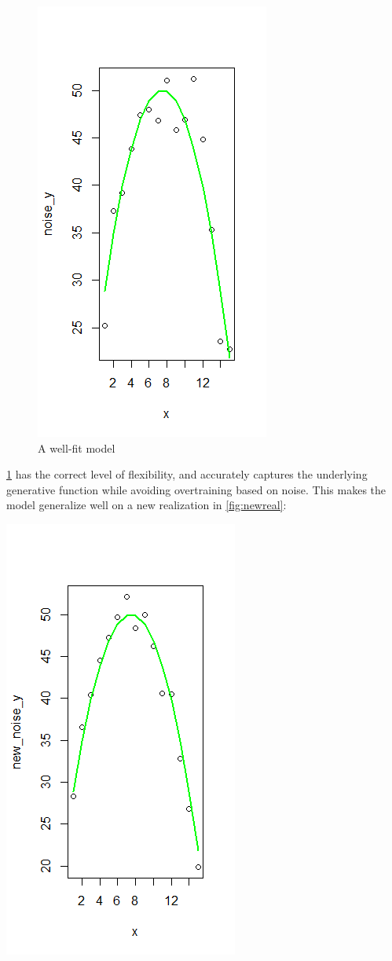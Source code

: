\documentclass[12pt,twoside]{reedthesis}
\begin{document}
\begin{figure}
\centering
\includegraphics{figure/true.png}
\caption{\label{fig:goodmod}A well-fit model}
\end{figure}
\ref{fig:goodmod} has the correct level of flexibility, and accurately
captures the underlying generative function while avoiding overtraining
based on noise. This makes the model generalize well on a new
realization in \ref{fig:newreal}:

\includegraphics{figure/stayGood.png}
\end{document}
